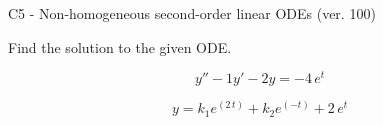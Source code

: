 \begin{exercise}
  \begin{exerciseTitle}C5 - Non-homogeneous second-order linear ODEs (ver. 100)\end{exerciseTitle}
  \begin{exerciseStatement}
    
Find the solution to the given ODE.

    
\[y''-1y'-2y = -4 \, e^{t}\]

  \end{exerciseStatement}
  \begin{exerciseAnswer}
    
\[y= k_{1} e^{\left(2 \, t\right)} + k_{2} e^{\left(-t\right)} + 2 \, e^{t}\]

  \end{exerciseAnswer}
\end{exercise}